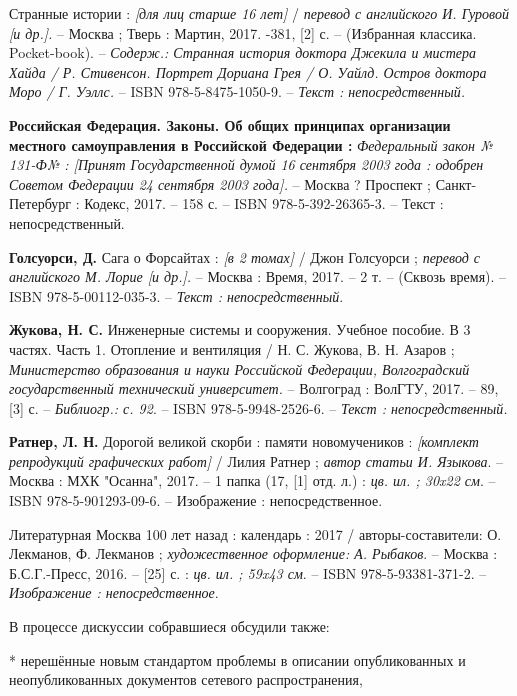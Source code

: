 Странные истории : \textit{{[}для лиц старше 16 лет{]}} / \textit{перевод с английского И. Гуровой {[}и др.{]}.} -- Москва ; Тверь : Мартин, 2017. -381, {[}2{]} с. -- (Избранная классика. Pocket-book). -- \textit{Содерж.: Странная история доктора Джекила и мистера Хайда / Р. Стивенсон. Портрет Дориана Грея / О. Уайлд. Остров доктора Моро / Г. Уэллс.} -- ISBN 978-5-8475-1050-9. -- \textit{Текст : непосредственный.}

\textbf{Российская Федерация. Законы. Об общих принципах организации местного самоуправления в Российской Федерации :} \textit{Федеральный закон № 131-Ф№ : {[}Принят Государственной думой 16 сентября 2003 года : одобрен Советом Федерации 24 сентября 2003 года{].}} -- Москва ? Проспект ; Санкт-Петербург : Кодекс, 2017. -- 158 с. -- ISBN 978-5-392-26365-3. -- Текст : непосредственный.

\textbf{Голсуорси, Д.} Сага о Форсайтах : \textit{{[}в 2 томах{]}} / Джон Голсуорси ; \textit{перевод с английского М. Лорие {[}и др.{]}.} -- Москва : Время, 2017. -- 2 т. -- (Сквозь время). -- ISBN 978-5-00112-035-3. -- \textit{Текст : непосредственный}.

\textbf{Жукова, Н. С.} Инженерные системы и сооружения. Учебное пособие. В 3 частях. Часть 1. Отопление и вентиляция / Н. С. Жукова, В. Н. Азаров ; \textit{Министерство образования и науки Российской Федерации, Волгоградский государственный технический университет.} -- Волгоград : ВолГТУ, 2017. -- 89, {[}3{]} с. -- \textit{Библиогр.: с. 92}. -- ISBN 978-5-9948-2526-6. -- \textit{Текст : непосредственный.}

\textbf{Ратнер, Л. Н.} Дорогой великой скорби : памяти новомучеников : \textit{{[}комплект репродукций графических работ{]}} / Лилия Ратнер ; \textit{автор статьи И. Языкова}. -- Москва : МХК "Осанна", 2017. -- 1 папка (17, {[}1{]} отд. л.) : \textit{{\color{red}цв. ил. ; 30x22 см}}. -- ISBN 978-5-901293-09-6. -- Изображение : непосредственное.

Литературная Москва 100 лет назад : календарь : 2017 / авторы-составители: О. Лекманов, Ф. Лекманов ; \textit{художественное оформление: А. Рыбаков}. -- Москва : Б.С.Г.-Пресс, 2016. -- {[25]} с. : \textit{{\color{red} цв. ил. ; 59x43 см}}. -- ISBN 978-5-93381-371-2. -- \textit{Изображение : непосредственное}.

\vspace{2cm}

В процессе дискуссии собравшиеся обсудили также:

* нерешённые новым стандартом проблемы в описании опубликованных и неопубликованных документов сетевого распространения,

